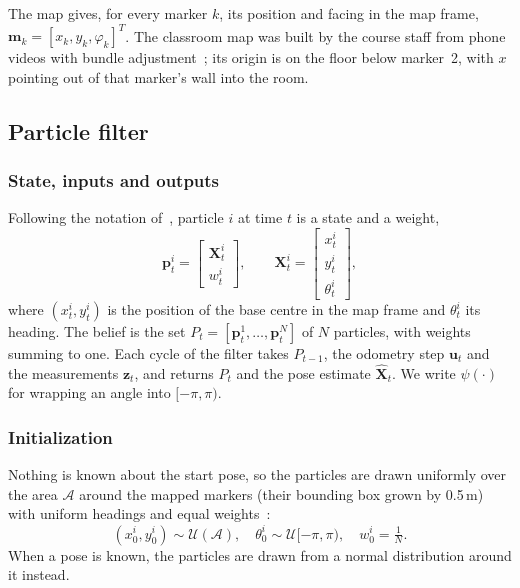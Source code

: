 \documentclass[conference]{IEEEtran}
\newcommand{\vect}[1]{\boldsymbol{#1}}
\begin{document}
The map gives, for every marker $k$, its position and facing in the map frame, $\vect{m}_k = [x_k, y_k, \varphi_k]^T$. The classroom map was built by the course staff from phone videos with bundle adjustment~\cite{for26}; its origin is on the floor below marker~2, with $x$ pointing out of that marker's wall into the room.

\subsection{Particle filter}
\subsubsection{State, inputs and outputs}
Following the notation of~\cite{clark7b}, particle $i$ at time $t$ is a state and a weight,
\begin{equation}
\vect{p}_t^i = \begin{bmatrix} \vect{X}_t^i \\ w_t^i \end{bmatrix}, \qquad
\vect{X}_t^i = \begin{bmatrix} x_t^i \\ y_t^i \\ \theta_t^i \end{bmatrix},
\label{eq:particle}
\end{equation}
where $(x_t^i, y_t^i)$ is the position of the base centre in the map frame and $\theta_t^i$ its heading. The belief is the set $P_t = [\vect{p}_t^1, \dots, \vect{p}_t^N]$ of $N$ particles, with weights summing to one. Each cycle of the filter takes $P_{t-1}$, the odometry step $\vect{u}_t$ and the measurements $\vect{z}_t$, and returns $P_t$ and the pose estimate $\hat{\vect{X}}_t$. We write $\psi(\cdot)$ for wrapping an angle into $[-\pi, \pi)$.

\subsubsection{Initialization}
Nothing is known about the start pose, so the particles are drawn uniformly over the area $\mathcal{A}$ around the mapped markers (their bounding box grown by 0.5\,m) with uniform headings and equal weights~\cite{clark7b}:
\begin{equation}
(x_0^i, y_0^i) \sim \mathcal{U}(\mathcal{A}), \quad \theta_0^i \sim \mathcal{U}[-\pi, \pi), \quad w_0^i = \tfrac{1}{N}.
\label{eq:init}
\end{equation}
When a pose is known, the particles are drawn from a normal distribution around it instead.
\end{document}
